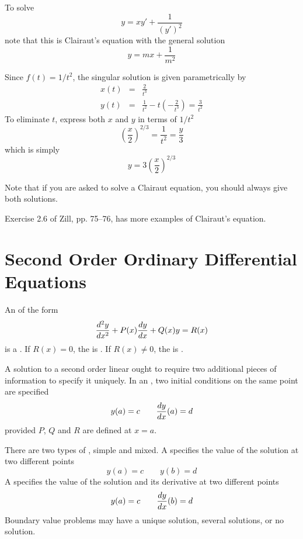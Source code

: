 \begin{example}
To solve
$$y=xy'+\frac{1}{(y')^2}$$
note that this is Clairaut's equation with the general solution
$$y=mx+\frac{1}{m^2}$$

Since $f(t)=1/t^2$, the singular solution is given parametrically by
\begin{eqnarray*}
x(t)&=&\frac{2}{t^3}\\
y(t)&=&\frac{1}{t^2}-t\left(-\frac{2}{t^3}\right)=\frac{3}{t^2}
\end{eqnarray*}
To eliminate $t$, express both $x$ and $y$ in terms of $1/t^2$
$$\left(\frac{x}{2}\right)^{2/3}=\frac{1}{t^2}=\frac{y}{3}$$
which is simply
$$y=3\left(\frac{x}{2}\right)^{2/3}$$

\end{example}

Note that if you are asked to solve a Clairaut equation, you should always
give both solutions.

\begin{exercise}
Exercise 2.6 of Zill, pp. 75--76, has more examples of Clairaut's equation.
\end{exercise}

\section[Second Order O.D.E.s]{Second Order Ordinary Differential Equations}
\label{ode sec:soode}

An \ODE of the form
$$\frac{d^2y}{d{x}^2}+P(x)\frac{dy}{dx}+Q(x)y=R(x)$$
is a .  If $R(x)=0$, the \ODE is
.  If $R(x)\neq 0$, the \ODE is .

A solution to a second order linear \ODE ought to require two additional
pieces of information to specify it uniquely.  In an , two initial conditions on the same point are specified
$$y(a)=c\qquad \frac{dy}{dx}(a)=d$$
provided $P$, $Q$ and $R$ are defined at $x=a$.

There are two types of , simple and mixed.
A  specifies the value of the solution at two
different points
$$y(a)=c\qquad y(b)=d$$
A  specifies the value of the solution and its
derivative at two different points
$$y(a)=c\qquad \frac{dy}{dx}(b)=d$$
Boundary value problems may have a unique solution, several solutions, or no
solution.

